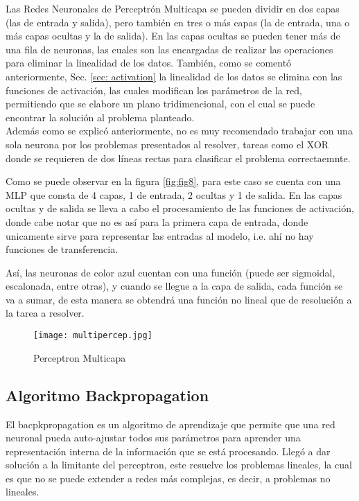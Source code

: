         Las Redes Neuronales de Perceptr\'on Multicapa se pueden dividir en dos capas (las de entrada y salida), pero también en tres o más capas (la de entrada, una o más capas ocultas y la de salida).  En las capas ocultas se pueden tener m\'as de una fila de neuronas, las cuales son las encargadas de realizar las operaciones para eliminar la linealidad de los datos.  También, como se comentó anteriormente,  Sec. \eqref{sec: activation} la linealidad de los datos se elimina con las funciones de activaci\'on,  las cuales modifican los parámetros de la red,  permitiendo que se elabore un plano tridimencional, con el cual se puede encontrar la soluci\'on al problema planteado.\\
        Adem\'as como se explicó anteriormente, no es muy recomendado trabajar con una sola neurona por los problemas presentados al resolver, tareas como el XOR donde se requieren de dos líneas rectas para clasificar el problema correctaemnte.

        Como se puede observar en la figura \eqref{fig:fig8}, para este caso se cuenta con una MLP que consta de 4 capas,  1 de entrada, 2 ocultas y 1 de salida. En las capas ocultas y de salida se lleva a cabo el procesamiento de las funciones de activación, donde cabe notar que no es así para la primera capa de entrada, donde unicamente sirve para representar las entradas al modelo, i.e. ahí no hay funciones de transferencia. 

        Así, las neuronas de color azul cuentan con una funci\'on (puede ser sigmoidal, escalonada, entre otras), y cuando se llegue a la capa de salida, cada funci\'on se va a sumar, de esta manera se obtendrá una funci\'on no lineal que de resoluci\'on a la tarea a resolver.
        \begin{figure}[H]
          \centering
          \texttt{[image: multipercep.jpg]}
          \caption{Perceptron Multicapa}
          \label{fig:fig8}
        \end{figure}

    \subsection{Algoritmo Backpropagation}
        
      El bacpkpropagation es un algoritmo de aprendizaje que permite que una red neuronal pueda auto-ajustar todos sus parámetros para aprender una representaci\'on interna de la informaci\'on que se está procesando. Lleg\'o a dar solución a la limitante del perceptron, este resuelve los problemas lineales, la cual es que no se puede extender a redes más complejas, es decir, a problemas no lineales. \\

